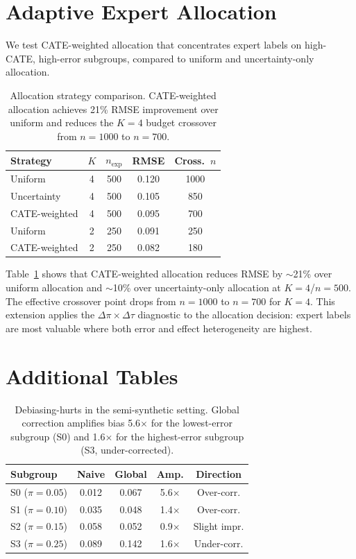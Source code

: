 \documentclass[11pt,twocolumn]{article}
\begin{document}
\section{Adaptive Expert Allocation}
\label{app:allocation}

We test CATE-weighted allocation that concentrates expert labels on high-CATE, high-error subgroups, compared to uniform and uncertainty-only allocation.

\begin{table}[t]
\centering
\caption{Allocation strategy comparison. CATE-weighted allocation achieves 21\% RMSE improvement over uniform and reduces the $K\!=\!4$ budget crossover from $n\!=\!1000$ to $n\!=\!700$.}
\label{tab:allocation}
\small
\begin{tabular}{@{}lcccc@{}}
\toprule
Strategy & $K$ & $n_{\text{exp}}$ & RMSE & Cross.\ $n$ \\
\midrule
Uniform & 4 & 500 & 0.120 & 1000 \\
Uncertainty & 4 & 500 & 0.105 & 850 \\
CATE-weighted & 4 & 500 & 0.095 & 700 \\
Uniform & 2 & 250 & 0.091 & 250 \\
CATE-weighted & 2 & 250 & 0.082 & 180 \\
\bottomrule
\end{tabular}
\end{table}

Table~\ref{tab:allocation} shows that CATE-weighted allocation reduces RMSE by $\sim$21\% over uniform allocation and $\sim$10\% over uncertainty-only allocation at $K\!=\!4$/$n\!=\!500$. The effective crossover point drops from $n\!=\!1000$ to $n\!=\!700$ for $K\!=\!4$. This extension applies the $\Delta\pi \times \Delta\tau$ diagnostic to the allocation decision: expert labels are most valuable where both error and effect heterogeneity are highest.

\section{Additional Tables}
\label{app:cf}

\begin{table}[t]
\centering
\caption{Debiasing-hurts in the semi-synthetic setting. Global correction amplifies bias 5.6$\times$ for the lowest-error subgroup (S0) and 1.6$\times$ for the highest-error subgroup (S3, under-corrected).}
\label{tab:semi_hurts}
\small
\begin{tabular}{@{}lcccc@{}}
\toprule
Subgroup & Naive & Global & Amp. & Direction \\
\midrule
S0 ($\pi\!=\!0.05$) & 0.012 & 0.067 & 5.6$\times$ & Over-corr. \\
S1 ($\pi\!=\!0.10$) & 0.035 & 0.048 & 1.4$\times$ & Over-corr. \\
S2 ($\pi\!=\!0.15$) & 0.058 & 0.052 & 0.9$\times$ & Slight impr. \\
S3 ($\pi\!=\!0.25$) & 0.089 & 0.142 & 1.6$\times$ & Under-corr. \\
\bottomrule
\end{tabular}
\end{table}
\end{document}
